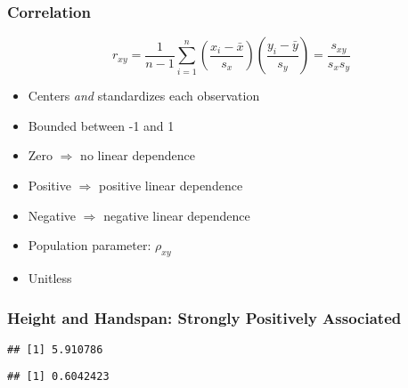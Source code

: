 \begin{frame}
\frametitle{Correlation}
	$$r_{xy} = \frac{1}{n-1} \sum_{i=1}^n \left(\frac{x_i -\bar{x}}{s_x}\right)\left(\frac{y_i - \bar{y}}{s_y}\right) = \frac{s_{xy}}{s_x s_y}$$

\begin{itemize}
	\item Centers \emph{and} standardizes each observation 
	\item Bounded between -1 and 1
	\item Zero $\Rightarrow$ no linear dependence
	\item Positive $\Rightarrow$ positive linear dependence
	\item Negative $\Rightarrow$ negative linear dependence
	\item Population parameter: $\rho_{xy}$
	\item Unitless
\end{itemize}
\end{frame}
\begin{frame}[fragile]
  \frametitle{Height and Handspan: Strongly Positively Associated}
  \small
\begin{knitrout}
\color{fgcolor}\begin{kframe}
\begin{alltt}
\hlopt{$}\hlopt{$}  \hlstd{=} \hlstd{)}
\end{alltt}
\begin{verbatim}
## [1] 5.910786
\end{verbatim}
\begin{alltt}
\hlopt{$}\hlopt{$}  \hlstd{=} \hlstd{)}
\end{alltt}
\begin{verbatim}
## [1] 0.6042423
\end{verbatim}
\end{kframe}
\end{knitrout}
\end{frame}
